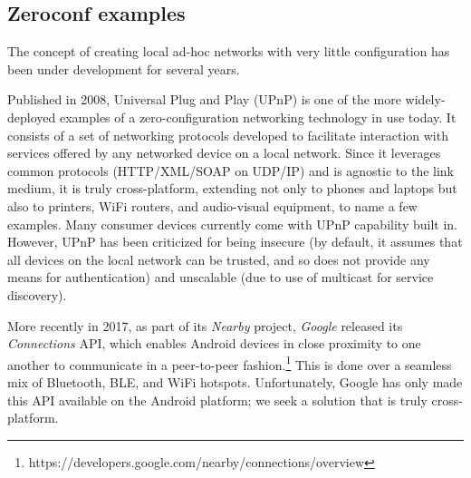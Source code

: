 \subsection{Zeroconf examples}
\label{sec:zerconf_examples}

The concept of creating local ad-hoc networks with very little configuration has been under development for several years.

Published in 2008, Universal Plug and Play (UPnP) is one of the more widely-deployed examples of a zero-configuration networking technology in use today. 
It consists of a set of networking protocols developed to facilitate interaction with services offered by any networked device on a local network.
Since it leverages common protocols (HTTP/XML/SOAP on UDP/IP) and is agnostic to the link medium, it is truly cross-platform, extending not only to phones and laptops but also to printers, WiFi routers, and audio-visual equipment, to name a few examples.
Many consumer devices currently come with UPnP capability built in.
However, UPnP has been criticized for being insecure (by default, it assumes that all devices on the local network can be trusted, and so does not provide any means for authentication) and unscalable (due to use of multicast for service discovery).

More recently in 2017, as part of its \textit{Nearby} project, \textit{Google} released its \textit{Connections} API, which enables Android devices in close proximity to one another to communicate in a peer-to-peer fashion.\footnote{https://developers.google.com/nearby/connections/overview}
This is done over a seamless mix of Bluetooth, BLE, and WiFi hotspots.
Unfortunately, Google has only made this API available on the Android platform; we seek a solution that is truly cross-platform.
